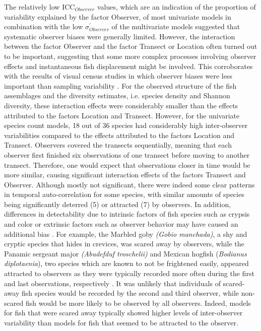 \documentclass[10pt,letterpaper]{article}
\begin{document}
The relatively low ICC$_{Observer}$ values, which are an indication of the proportion of variability explained by the factor Observer, of most univariate models in combination with the low $\sigma^{'}_{Observer}$ of the multivariate models suggested that systematic observer biases were generally limited. However, the interaction between the factor Observer and the factor Transect or Location often turned out to be important, suggesting that some more complex processes involving observer effects and instantaneous fish displacement might be involved. This corroborates with the results of visual census studies in which observer biases were less important than sampling variability \cite{Edgar2004,Williams2006}. For the observed structure of the fish assemblages and the diversity estimates, i.e. species density and Shannon diversity, these interaction effects were considerably smaller than the effects attributed to the factors Location and Transect. However, for the univariate species count models, 18 out of 36 species had considerably high inter-observer variabilities compared to the effects attributed to the factors Location and Transect. Observers covered the transects sequentially, meaning that each observer first finished six observations of one transect before moving to another transect. Therefore, one would expect that observations closer in time would be more similar, causing significant interaction effects of the factors Transect and Observer. Although mostly not significant, there were indeed some clear patterns in temporal auto-correlation for some species, with similar amounts of species being significantly deterred (5) or attracted (7) by observers. In addition, differences in detectability due to intrinsic factors of fish species such as crypsis and color or extrinsic factors such as observer behavior may have caused an additional bias \cite{Boulinier1998,MacNeil2008,Willis2001}. For example, the Marbled goby \textit{(Gobio manchada)}, a shy and cryptic species that hides in crevices, was scared away by observers, while the Panamic sergeant major \textit{(Abudefduf troschelii)} and Mexican hogfish (\textit{Bodianus diplotaenia}), two species which are known to not be frightened easily, appeared attracted to observers as they were typically recorded more often during the first and last observations, respectively \cite{Humann2003ReefGalapagos}. It was unlikely that individuals of scared-away fish species would be recorded by the second and third observer, while non-scared fish would be more likely to be observed by all observers. Indeed, models for fish that were scared away typically showed higher levels of inter-observer variability than models for fish that seemed to be attracted to the observer. 
\end{document}
